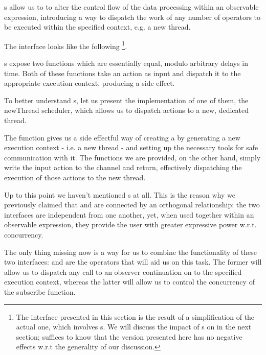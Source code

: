 s allow us to to alter the control flow of the data processing within an observable expression, introducing a way to dispatch the work of any number of operators to be executed within the specified context, e.g. a new thread.

The  interface looks like the following \footnote{The interface presented in this section is the result of a simplification of the actual one, which involves s. We will discuss the impact of s on  in the next section; suffices to know that the version presented here has no negative effects w.r.t the generality of our discussion.}.


s expose two functions which are essentially equal, modulo arbitrary delays in time. Both of these functions take an  action as input and dispatch it to the appropriate execution context, producing a side effect. 

To better understand s, let us present the implementation of one of them, the newThread scheduler, which allows us to dispatch actions to a new, dedicated thread.


The  function gives us a side effectful way of creating a  by generating a new execution context - i.e. a new thread - and setting up the necessary tools for safe communication with it. The  functions we are provided, on the other hand, simply write the input  action to the channel and return, effectively dispatching the execution of those actions to the new thread. 

Up to this point we haven't mentioned s at all. This is the reason why we previously claimed that  and  are connected by an orthogonal relationship: the two interfaces are independent from one another, yet, when used together within an observable expression, they provide the user with greater expressive power w.r.t. concurrency. 

The only thing missing now is a way for us to combine the functionality of these two interfaces:  and  are the operators that will aid us on this task. The former will allow us to dispatch any call to an observer continuation on to the specified execution context, whereas the latter will allow us to control the concurrency of the  subscribe function.

